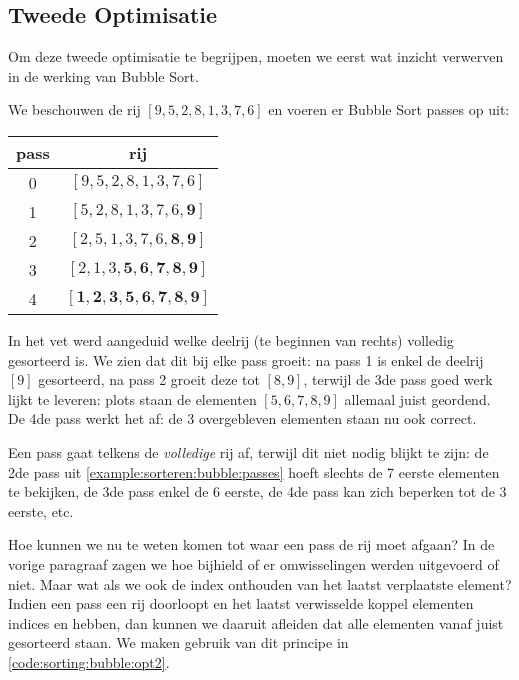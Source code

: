 \subsection{Tweede Optimisatie} \label{sec:sorteren:bubble-sort:opt2}
Om deze tweede optimisatie te begrijpen, moeten we eerst wat inzicht
verwerven in de werking van Bubble Sort.

\begin{example} \label{example:sorteren:bubble:passes}
\newcommand{\HL}[1]{\textbf{#1}}
We beschouwen de rij $[ 9, 5, 2, 8, 1, 3, 7, 6 ]$ en voeren er Bubble Sort passes op uit:
\begin{center}
  \begin{tabular}{c|c}
    \textbf{pass} & \textbf{rij} \\
    \hline
    0 & $[ 9, 5, 2, 8, 1, 3, 7, 6 ]$ \\
    1 & $[ 5, 2, 8, 1, 3, 7, 6, \HL9 ]$ \\
    2 & $[ 2, 5, 1, 3, 7, 6, \HL8, \HL9 ]$ \\
    3 & $[ 2, 1, 3, \HL5, \HL6, \HL7, \HL8, \HL9 ]$ \\
    4 & $[ \HL1, \HL2, \HL3, \HL5, \HL6, \HL7, \HL8, \HL9 ]$ \\
  \end{tabular}
\end{center}
In het vet werd aangeduid welke deelrij (te beginnen van rechts) volledig gesorteerd is.
We zien dat dit bij elke pass groeit: na pass 1 is enkel de deelrij $[9]$ gesorteerd,
na pass 2 groeit deze tot $[8, 9]$, terwijl de 3de pass goed werk lijkt te leveren:
plots staan de elementen $[5, 6, 7, 8, 9]$ allemaal juist geordend. De 4de pass
werkt het af: de 3 overgebleven elementen staan nu ook correct.
\end{example}

Een pass gaat telkens de \emph{volledige} rij af, terwijl dit niet nodig blijkt te zijn:
de 2de pass uit \cref{example:sorteren:bubble:passes} hoeft slechts de 7 eerste elementen te bekijken,
de 3de pass enkel de 6 eerste, de 4de pass kan zich beperken tot de 3 eerste, etc.

Hoe kunnen we nu te weten komen tot waar een pass de rij moet afgaan?
In de vorige paragraaf zagen we hoe  bijhield
of er omwisselingen werden uitgevoerd of niet. Maar wat als we ook de index
onthouden van het laatst verplaatste element? Indien een pass een rij doorloopt
en het laatst verwisselde koppel elementen indices  en 
hebben, dan kunnen we daaruit afleiden dat alle elementen vanaf  juist
gesorteerd staan. We maken gebruik van dit principe in \cref{code:sorting:bubble:opt2}.

